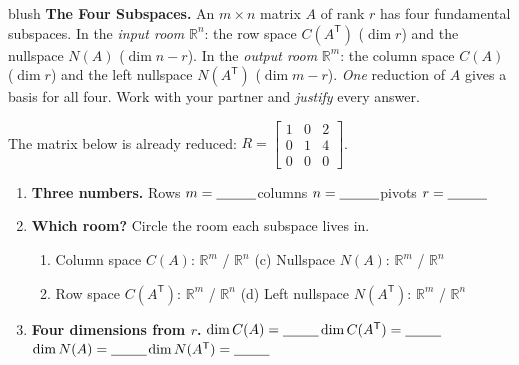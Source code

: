 \documentclass[10pt]{article}
\newcommand{\T}{\mathsf{T}}
\begin{document}
\namepartnerperiod

\vspace{0.10in}

\begin{headlinebox}{blush}
\small\textbf{The Four Subspaces.} An $m\times n$ matrix $A$ of rank $r$ has four fundamental subspaces. In
the \emph{input room} $\mathbb{R}^n$: the row space $C(A^{\T})$ ($\dim r$) and the nullspace $N(A)$
($\dim n-r$). In the \emph{output room} $\mathbb{R}^m$: the column space $C(A)$ ($\dim r$) and the left
nullspace $N(A^{\T})$ ($\dim m-r$). \emph{One} reduction of $A$ gives a basis for all four. Work with your
partner and \emph{justify} every answer.
\end{headlinebox}

\vspace{0.10in}

\begin{tcolorbox}[colback=white, colframe=black!40, title=\textbf{Tier R --- Remediate},
    fonttitle=\bfseries, arc=1.5mm, left=3mm, right=3mm, top=2mm, bottom=2mm, breakable]
The matrix below is already reduced: $R=\begin{bmatrix} 1 & 0 & 2 \\ 0 & 1 & 4 \\ 0 & 0 & 0 \end{bmatrix}$.
\begin{enumerate}[leftmargin=1.7em, itemsep=8pt]
  \item \textbf{Three numbers.} Rows $m=\blank{1.0cm}$\quad columns $n=\blank{1.0cm}$\quad pivots $r=\blank{1.0cm}$
  \item \textbf{Which room?} Circle the room each subspace lives in.
    \begin{enumerate}[label=(\alph*), leftmargin=1.8em, itemsep=4pt]
      \item Column space $C(A)$: \quad $\mathbb{R}^m$ / $\mathbb{R}^n$ \qquad\qquad
            (c)\; Nullspace $N(A)$: \quad $\mathbb{R}^m$ / $\mathbb{R}^n$
      \item Row space $C(A^{\T})$: \quad $\mathbb{R}^m$ / $\mathbb{R}^n$ \qquad\quad
            (d)\; Left nullspace $N(A^{\T})$: \quad $\mathbb{R}^m$ / $\mathbb{R}^n$
    \end{enumerate}
  \item \textbf{Four dimensions from $r$.}
        $\dim C(A)=\blank{0.9cm}$\quad $\dim C(A^{\T})=\blank{0.9cm}$\quad
        $\dim N(A)=\blank{0.9cm}$\quad $\dim N(A^{\T})=\blank{0.9cm}$
\end{enumerate}
\end{tcolorbox}
\end{document}
